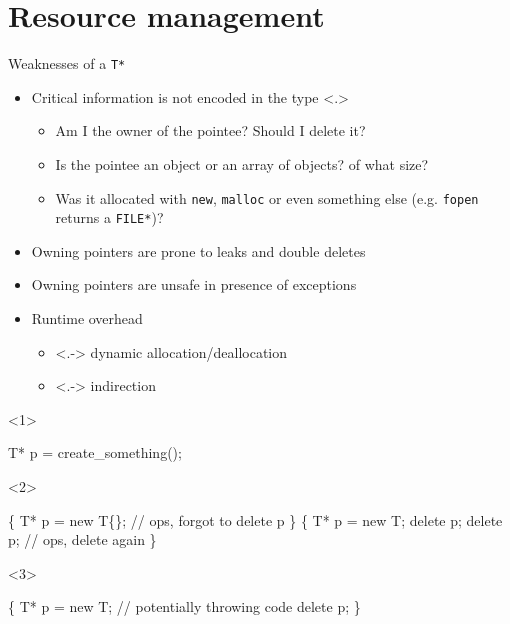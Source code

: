 
\section{Resource management}

\begin{frame}[fragile]{Weaknesses of a \texttt{T*}}

  \begin{itemize}[<+->]
  \item Critical information is not encoded in the type
    \only<.>{
      \begin{itemize}[<.>]
      \item Am I the owner of the pointee? Should I delete it?
      \item Is the pointee an object or an array of objects? of what size?
      \item Was it allocated with \texttt{new}, \texttt{malloc} or even something
        else (e.g. \texttt{fopen} returns a \texttt{FILE*})?
      \end{itemize}
    }
  \item Owning pointers are prone to leaks and double deletes
  \item Owning pointers are unsafe in presence of exceptions
  \item Runtime overhead
    \begin{itemize}
    \item<.-> dynamic allocation/deallocation
    \item<.-> indirection
    \end{itemize}
  \end{itemize}

  \begin{onlyenv}<1> %
    \begin{codeblock}
T* p = create\_something();\end{codeblock}
  \end{onlyenv}

  \begin{onlyenv}<2>
    \begin{codeblock}
\{
  T* p = new T\{\};
  \ddd
  // ops, forgot to delete p
\}
\{
  T* p = new T;
  \ddd
  delete p;
  \ddd
  delete p; // ops, delete again
\}\end{codeblock}
  \end{onlyenv}

  \begin{onlyenv}<3>
    \begin{codeblock}
\{
  T* p = new T;
  \ddd // potentially throwing code
  delete p;
\}\end{codeblock}
  \end{onlyenv}

\end{frame}

